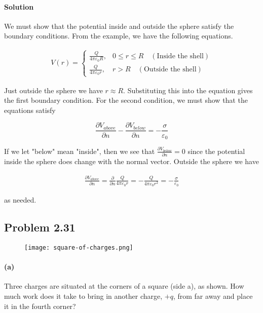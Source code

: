 \documentclass{article}
\begin{document}
\paragraph{Solution} We must show that the potential inside and outside the sphere satisfy the boundary conditions. From the example, we have the following equations. 

\begin{align*}
    V(r) =
\begin{cases}
\frac{Q}{4\pi\varepsilon_0 R}, & 0 \leq r \leq R \quad (\text{Inside the shell}) \\[10pt]
\frac{Q}{4\pi\varepsilon_0 r}, & r > R \quad (\text{Outside the shell})
\end{cases}
\end{align*}

Just outside the sphere we have $r \approx R$. Substituting this into the equation gives the first boundary condition. For the second condition, we must show that the equations satisfy 

$$\frac{\partial V_{above}}{\partial n} - \frac{\partial V_{below}}{\partial n} = -\frac{\sigma}{\varepsilon_0}$$

If we let "below" mean "inside", then we see that $\frac{\partial V_{below}}{\partial n} = 0$ since the potential inside the sphere does change with the normal vector.  Outside the sphere we have

\begin{align*}
    \frac{\partial V_{above}}{\partial n} = \frac{\partial }{\partial n} \frac{Q}{4\pi \varepsilon_0r} = -\frac{Q}{4\pi\varepsilon_0r^2} = -\frac{\sigma}{\varepsilon_0}
\end{align*}

as needed.

\newpage

\subsection*{Problem 2.31}

\begin{figure}[h]
    \centering
    \texttt{[image: square-of-charges.png]}
\end{figure}

\paragraph{(a)} Three charges are situated at the corners of a square (side a), as shown.  How much work does it take to bring in another charge, $+q$, from far away and place it in the fourth corner?
\end{document}
